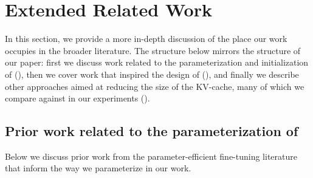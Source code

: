 
\section{Extended Related Work}
\label{app:related-work}
In this section, we provide a more in-depth discussion of the place our work occupies in the broader literature.
The structure below mirrors the structure of our paper: first we discuss work related to the parameterization and initialization of \artifacts (), then we cover work that inspired the design of \method (), and finally we describe other approaches aimed at reducing the size of the KV-cache, many of which we compare against in our experiments ().
\subsection{Prior work related to the parameterization of \artifacts}
\label{app:related-work-artifact}
Below we discuss prior work from the parameter-efficient fine-tuning literature that inform the way we parameterize \artifacts in our work.

